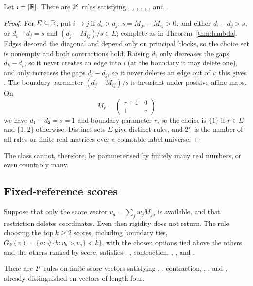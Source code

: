 \begin{proposition}\label{prop:cardinality}
Let $\mathfrak{c}=\lvert\mathbb{R}\rvert$. There are $2^{\mathfrak{c}}$ rules satisfying , , \Cpr, \Ccol, , ,
and \Mon.
\end{proposition}

\begin{proof}
For $E\subseteq\mathbb{R}$, put $i\to j$ if $d_i>d_j$, $s=M_{ji}-M_{ij}>0$, and either $d_i-d_j>s$, or $d_i-d_j=s$ and
$(d_j-M_{ij})/s\in E$; complete as in Theorem~\ref{thm:lambda}. Edges descend the diagonal and depend only
on principal blocks, so the choice set is nonempty and both contractions hold. Raising $d_i$ only
decreases the gaps $d_k-d_i$, so it never creates an edge into $i$ (at the boundary it may delete one),
and only increases the gaps $d_i-d_j$, so it never deletes an edge out of $i$; this gives \Mon. The
boundary parameter $(d_j-M_{ij})/s$ is invariant under positive affine maps. On
\[
  M_r=\begin{pmatrix}r+1&0\\1&r\end{pmatrix}
\]
we have $d_1-d_2=s=1$ and boundary parameter $r$, so the choice is $\{1\}$ if $r\in E$ and $\{1,2\}$
otherwise. Distinct sets $E$ give distinct rules, and $2^{\mathfrak{c}}$ is the number of all rules on finite real
matrices over a countable label universe.
\end{proof}

The class cannot, therefore, be parameterised by finitely many real numbers, or even countably many.

\subsection{Fixed-reference scores}

Suppose that only the score vector $v_a=\sum_jw_jM_{ja}$ is available, and that restriction deletes
coordinates. Even then rigidity does not return. The rule choosing the top $k\ge2$ scores, including
boundary ties, $G_k(v)=\{a:\#\{b:v_b>v_a\}<k\}$, with the chosen options tied above the others and the
others ranked by score, satisfies , , contraction, , , and \Mon.

\begin{proposition}\label{prop:scores}
There are $2^{\mathfrak{c}}$ rules on finite score vectors satisfying , , contraction, , , and
\Mon, already distinguished on vectors of length four.
\end{proposition}

